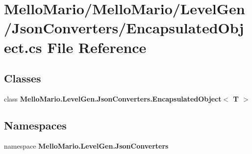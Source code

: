 \section{Mello\+Mario/\+Mello\+Mario/\+Level\+Gen/\+Json\+Converters/\+Encapsulated\+Object.cs File Reference}
\label{EncapsulatedObject_8cs}
\subsection*{Classes}
\begin{DoxyCompactItemize}
\item 
class \textbf{ Mello\+Mario.\+Level\+Gen.\+Json\+Converters.\+Encapsulated\+Object$<$ T $>$}
\end{DoxyCompactItemize}
\subsection*{Namespaces}
\begin{DoxyCompactItemize}
\item 
namespace \textbf{ Mello\+Mario.\+Level\+Gen.\+Json\+Converters}
\end{DoxyCompactItemize}
